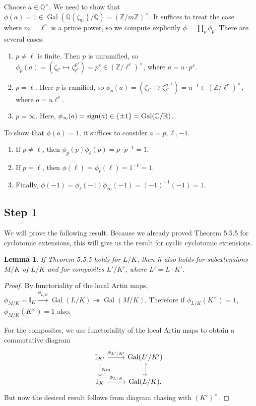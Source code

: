 \documentclass[leqno, openany]{memoir}
\newtheorem{lem}[thm]{Lemma}
\theoremstyle{definition}
\theoremstyle{remark}
\theoremstyle{plain}
\theoremstyle{definition}
\theoremstyle{remark}
\newcommand{\R}{\mathbb{R}}
\newcommand{\C}{\mathbb{C}}
\newcommand{\Z}{\mathbb{Z}}
\newcommand{\Q}{\mathbb{Q}}
\newcommand{\I}{\mathbb{I}}
\newcommand{\mr}[1]{\mathrm{#1}}
\DeclareMathOperator{\Gal}{Gal}
\DeclareMathOperator{\Nm}{Nm}
\begin{document}
Choose $a \in \Q^{\times}$. We need to show that $\phi(a) = 1 \in \Gal(\Q(\zeta_m)/\Q) = {(\Z/m\Z)}^{\times}$. It suffices to treat the case where $m = \ell^r$ is a prime power, so we compute explicitly $\phi = \prod_p \phi_p$. There are several cases:
\begin{enumerate}
    \item $p \neq \ell$ is finite. Then $p$ is unramified, so $\phi_p(a) = (\zeta_{\ell^r} \mapsto \zeta_{\ell^r}^{p^s}) = p^s \in {(\Z/\ell^r)}^{\times}$, where $a = u \cdot p^s$.
    \item $p=\ell$. Here $p$ is ramified, so $\phi_p(a) = (\zeta_{\ell^r} \mapsto \zeta_{\ell^r}^{u^{-1}}) = u^{-1} \in {(\Z/\ell^r)}^{\times}$, where $a=u\ell^s$.
    \item $p=\infty$. Here, $\phi_{\infty}(a) = \mr{sign}(a) \in \qty{\pm 1} = \Gal(\C/\R)$.
\end{enumerate}
To show that $\phi(a) = 1$, it suffices to consider $a=p, \ell, -1$.
\begin{enumerate}
    \item If $p\neq \ell$, then $\phi_p(p) \phi_{\ell}(p) = p \cdot p^{-1} = 1$.
    \item If $p=\ell$, then $\phi(\ell) = \phi_{\ell}(\ell) = 1^{-1} = 1$.
    \item Finally, $\phi(-1) = \phi_{\ell}(-1) \phi_{\infty}(-1) = {(-1)}^{-1} (-1) = 1$.
\end{enumerate}

\subsection{Step 1}%
\label{sub:step_1}

We will prove the following result. Because we already proved Theorem 5.5.5 for cyclotomic extensions, this will give us the result for cyclic cyclotomic extensions.
\begin{lem}
    If Theorem 5.5.5 holds for $L/K$, then it also holds for subextensions $M/K$ of $L/K$ and for composites $L'/K'$, where $L' = L \cdot K'$.
\end{lem}

\begin{proof}
    By functoriality of the local Artin maps, $\phi_{M/K} = \I_K \xrightarrow{\phi_{L/K}} \Gal(L/K) \twoheadrightarrow \Gal(M/K)$. Therefore if $\phi_{L/K}(K^{\times}) = 1$, $\phi_{M/K}(K^{\times}) = 1$ also.

    For the composites, we use functoriality of the local Artin maps to obtain a commutative diagram
    \begin{equation*}
    \begin{tikzcd}
        \I_{K'} \ar{r}{\phi_{L'/K'}} \ar{d}{\Nm} & \Gal(L'/K') \ar[hookrightarrow]{d} \\
        \I_K \ar{r}{\phi_{L/K}} & \Gal(L/K).
    \end{tikzcd}
    \end{equation*}
    But now the desired result follows from diagram chasing with ${(K')}^{\times}$.
\end{proof}
\end{document}
